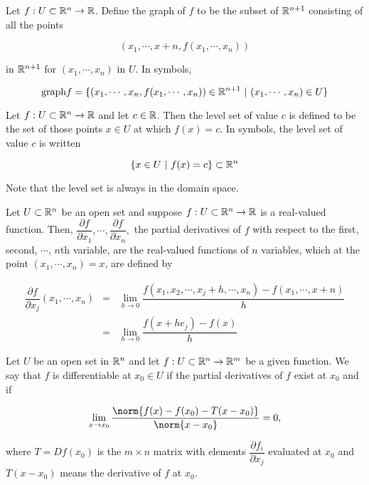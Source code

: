 


\cfoot{\thepage} %

\begin{defn}
	Let $f: U \subset \mathbb{R}^n \rightarrow \mathbb{R}$. Define the graph of $f$ to be the subset of $\mathbb{R}^{n+1}$ consisting of all the points
	
	$$ (x_1,\cdots,x+n,f(x_1,\cdots,x_n))$$
	
	in $\mathbb{R}^{n+1}$ for $(x_1,\cdots,x_n)$ in $U$. In symbols,
	
	$$\text{graph}f = \{(x_1,\cdots,x_n,f(x_1,\cdots,x_n)) \in \mathbb{R}^{n+1} ~|~(x_1,\cdots,x_n) \in U\}$$	
\end{defn}

\begin{defn}
	Let $f: U \subset \mathbb{R}^n \rightarrow \mathbb{R}$ and let $c \in \mathbb{R}$. Then the level set of value $c$ is defined to be the set of those points $x \in U$ at which $f(x) = c$. In symbols, the level set of value $c$ is written
	
	$$\{ x \in U ~|~ f(x) = c\} \subset \mathbb{R}^n$$
	
	Note that the level set is always in the domain space.
\end{defn}

\begin{defn}
	Let $U \subset \mathbb{R}^n$ be an open set and suppose $f:U \subset \mathbb{R}^n \rightarrow \mathbb{R}$ is a real-valued function. Then, $\dfrac{\partial f}{\partial x_1},\cdots,\dfrac{\partial f}{\partial x_n},$ the partial derivatives of $f$ with respect to the first, second, $\cdots$, $n$th variable, are the real-valued functions of $n$ variables, which at the point $(x_1,\cdots, x_n) = x$, are defined by
	
\begin{eqnarray*}
	\dfrac{\partial f}{\partial x_j}(x_1,\cdots,x_n) &=& \lim_{h \rightarrow 0} \dfrac{f(x_1,x_2,\cdots,x_j+h,\cdots,x_n) - f(x_1,\cdots,x+n)}{h}\\
	&=& \lim_{h \rightarrow 0}\dfrac{f(x+he_j)-f(x)}{h} 
\end{eqnarray*}
	
\end{defn}

\begin{defn}
	Let $U$ be an open set in $\mathbb{R}^n$ and let $f: U \subset \mathbb{R}^n \rightarrow \mathbb{R}^m$ be a given function. We say that $f$ is differentiable at $x_0 \in U$ if the partial derivatives of $f$ exist at $x_0$ and if 
	
	$$\lim_{x \rightarrow x_0} \dfrac{\norm{f(x) - f(x_0) - T(x-x_0)}}{\norm{x-x_0}} = 0,$$
	
	where $T = Df(x_0)$ is the $m \times n$ matrix with elements $\dfrac{\partial f_i}{\partial x_j}$ evaluated at $x_0$ and $T(x-x_0)$ means the derivative of $f$ at $x_0$.	
\end{defn}

